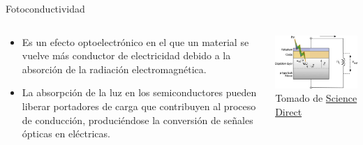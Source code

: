 \documentclass[aspectratio=169]{beamer}
\begin{document}
\begin{frame}{Fotoconductividad}
    \begin{columns}[c, onlytextwidth]
        \begin{column}{0.55\textwidth}
            \begin{itemize}
                \item Es un efecto optoelectrónico en el que un material se vuelve más conductor de electricidad debido a la absorción de la radiación electromagnética.
                \item La absorpción de la luz en los semiconductores pueden liberar portadores de carga que contribuyen al proceso de conducción, produciéndose la conversión de señales ópticas en eléctricas.
                \end{itemize}
        \end{column}
        \begin{column}{0.45\textwidth}
            \centering
    \includegraphics[width = 1\linewidth]{fig/Optica/photocondutivity.jpg}\\
            \tiny{Tomado de \href{https://www.sciencedirect.com/topics/materials-science/photoconductivity/}{Science Direct}}
        \end{column}
    \end{columns}
\end{frame}
\end{document}
